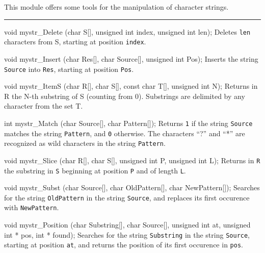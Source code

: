 
This module offers some tools for the manipulation of
character strings. 

\bigskip\hrule
\code\iffalse
/* mystr.h for ANSI C */

#ifndef MYSTR_H
#define MYSTR_H
\fi

void mystr_Delete (char S[], unsigned int index, unsigned int len);
\endcode
 \tab  Deletes {\tt len} characters from S, starting at position
 {\tt index}.
 \endtab
\code


void mystr_Insert (char Res[], char Source[], unsigned int Pos);
\endcode
 \tab  Inserts the string {\tt Source} into {\tt Res}, 
  starting at position {\tt Pos}.
 \endtab
\code


void mystr_ItemS (char R[], char S[], const char T[], unsigned int N);
\endcode
 \tab  Returns in R the N-th substring of S (counting from 0).
  Substrings are delimited by any character from the set T.
 \endtab
\code


int mystr_Match (char Source[], char Pattern[]);
\endcode
 \tab  Returns {\tt 1} if the string {\tt Source} matches the 
  string {\tt Pattern}, and {\tt 0} otherwise.
  The characters ``?'' and ``*'' are recognized as wild characters in the
  string {\tt Pattern}.
 \endtab
\code


void mystr_Slice (char R[], char S[], unsigned int P, unsigned int L);
\endcode
 \tab  Returns in {\tt R} the substring in {\tt S} beginning at
  position {\tt P} and of length {\tt L}.
 \endtab
\code


void mystr_Subst (char Source[], char OldPattern[], char NewPattern[]);
\endcode
 \tab  Searches for the string {\tt OldPattern} in the string {\tt Source}, 
 and replaces its first occurence with {\tt NewPattern}.
 \endtab
\code


void mystr_Position (char Substring[], char Source[], unsigned int at,
                     unsigned int * pos, int * found);
\endcode
 \tab  Searches for the string {\tt Substring} in the string {\tt Source},
 starting at position {\tt at}, and returns the position of its first
 occurence in {\tt pos}.
 \endtab
\code
\iffalse

#endif
\fi\endcode
